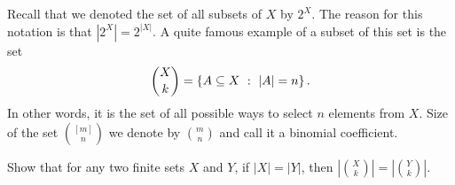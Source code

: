 Recall that we denoted the set of all subsets of $X$ by $2^X$. The reason for
this notation is that $|2^X| = 2^{|X|}$. A quite famous example of a subset of
this set is the set
\[
  \binom{X}{k} = \set[|A| = n]{A \subseteq X}.
\]
In other words, it is the set of all possible ways to select $n$ elements from
$X$. Size of the set $\binom{[m]}{n}$ we denote by $\binom{m}{n}$ and call it a
binomial coefficient.
\begin{exercise}
  Show that for any two finite sets $X$ and $Y$, if $|X| = |Y|$, then
  $\left|\binom{X}{k}\right| = \left|\binom{Y}{k}\right|$.
\end{exercise}

